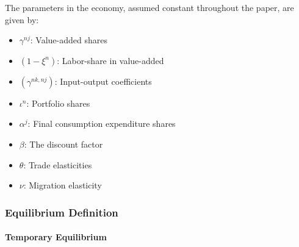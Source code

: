 \documentclass[10pt]{article}
\begin{document}
The parameters in the economy, assumed constant throughout the paper, 
are given by:

\begin{itemize}
    \item $\gamma^{n j}$: Value-added shares
    \item $\left(1-\xi^n\right)$: Labor-share in value-added
    \item $\left(\gamma^{n k, n j}\right)$: Input-output coefficients
    \item $\iota^n$: Portfolio shares
    \item $\alpha^j$: Final consumption expenditure shares
    \item $\beta$: The discount factor
    \item $\theta$: Trade elasticities
    \item $\nu$: Migration elasticity
\end{itemize}


\subsubsection{Equilibrium Definition}

\paragraph{Temporary Equilibrium}
\end{document}
